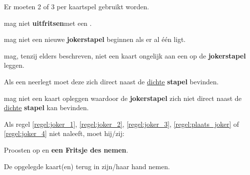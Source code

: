 \newpage
{}
\label{sec:jokers}


\vervolgLijst{}
    \item Er moeten 2 of 3 \footnotemark[2] per kaartspel gebruikt worden.
\eindLijst{}

\vervolgLijst{}
    \item \EenSpeler mag niet \textbf{uitfritsen}\footnotemark[3] met een \footnotemark[2].
    \label{regel:joker_1}
\eindLijst{}

\vervolgLijst{}
    \item \EenSpeler mag niet een nieuwe \textbf{jokerstapel} beginnen als er al \'e\'en ligt.
    \label{regel:joker_2}
\eindLijst{}

\vervolgLijst{}
    \item \EenSpeler mag, tenzij elders beschreven, niet een kaart ongelijk aan een \footnotemark[2] op de \textbf{jokerstapel} leggen.
    \label{regel:joker_3}
\eindLijst{}

\vervolgLijst{}
    \item Als \eenSpeler een \footnotemark[2] neerlegt moet deze zich direct naast de \ul{dichte} \textbf{stapel} bevinden.
    \label{regel:plaats_joker}
\eindLijst{}

\vervolgLijst{}
    \item \EenSpeler mag niet een kaart opleggen waardoor de \textbf{jokerstapel} zich niet direct naast de \ul{dichte} \textbf{stapel} kan bevinden.
    \label{regel:joker_4}
\eindLijst{}

\vervolgLijst{}
    \item Als \eenSpeler regel \ref{regel:joker_1}, \ref{regel:joker_2}, \ref{regel:joker_3}, \ref{regel:plaats_joker} of \ref{regel:joker_4} niet naleeft, moet hij/zij:
    \puntLijst{}
        \item Proosten op  en \textbf{een Fritsje des nemen}\footnotemark[4].
        \item De opgelegde kaart(en) terug in zijn/haar hand nemen.
    \eindPuntLijst{}
    \label{regel:kaarten_terugnemen_3}
\eindLijst{}


